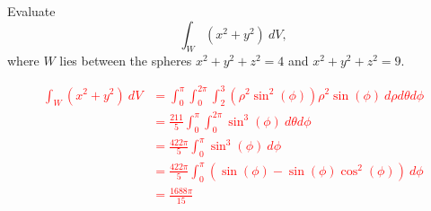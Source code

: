 \documentclass[12pt,reqno]{amsart}
\begin{document}
\prob Evaluate
	\[\int_W (x^2+y^2) \ dV,
	\]
where $W$ lies between the spheres $x^2+y^2+z^2=4$ and $x^2+y^2+z^2=9$.

\bigskip
\textcolor{red}{
\begin{align*}
\int_W (x^2+y^2) \ dV &= \int_0^\pi \int_0^{2\pi} \int_2^3 (\rho^2 \sin^2{(\phi)}) \rho^2 \sin{(\phi)} \ d\rho d\theta d\phi \\
&= \frac{211}{5}\int_0^\pi \int_0^{2\pi} \sin^3{(\phi)} \ d\theta d\phi \\
&=  \frac{422\pi}{5} \int_0^\pi \sin^3{(\phi)} \ d\phi \\
&= \frac{422\pi}{5}\int_0^\pi(\sin{(\phi)} - \sin{(\phi)} \cos^2{(\phi)}) \ d\phi \\
&= \frac{1688\pi}{15}
\end{align*}}
\end{document}
